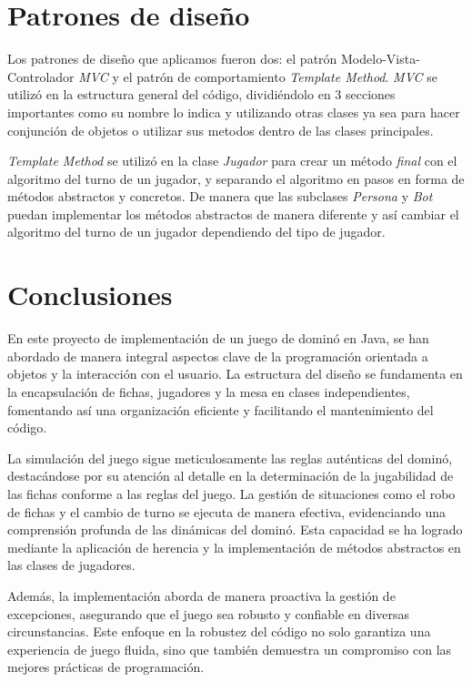 \documentclass[12pt]{article}
\begin{document}
  \section{Patrones de diseño}
  Los patrones de diseño que aplicamos fueron dos: el patrón Modelo-Vista-Controlador \textit{MVC} y el patrón de comportamiento \textit{Template Method}. \textit{MVC} se utilizó en la estructura general del código, dividiéndolo en 3 secciones importantes como su nombre lo indica y utilizando otras clases ya sea para hacer conjunción de objetos o utilizar sus metodos dentro de las clases principales. 
  
  \textit{Template Method} se utilizó en la clase \textit{Jugador} para crear un método \textit{final} con el algoritmo del turno de un jugador, y separando el algoritmo en pasos en forma de métodos abstractos y concretos. De manera que las subclases \textit{Persona} y \textit{Bot} puedan implementar los métodos abstractos de manera diferente y así cambiar el algoritmo del turno de un jugador dependiendo del tipo de jugador.

  \section{Conclusiones}
  En este proyecto de implementación de un juego de dominó en Java, se han abordado de manera integral aspectos clave de la programación orientada a objetos y la interacción con el usuario. La estructura del diseño se fundamenta en la encapsulación de fichas, jugadores y la mesa en clases independientes, fomentando así una organización eficiente y facilitando el mantenimiento del código.

  La simulación del juego sigue meticulosamente las reglas auténticas del dominó, destacándose por su atención al detalle en la determinación de la jugabilidad de las fichas conforme a las reglas del juego. La gestión de situaciones como el robo de fichas y el cambio de turno se ejecuta de manera efectiva, evidenciando una comprensión profunda de las dinámicas del dominó. Esta capacidad se ha logrado mediante la aplicación de herencia y la implementación de métodos abstractos en las clases de jugadores.

  Además, la implementación aborda de manera proactiva la gestión de excepciones, asegurando que el juego sea robusto y confiable en diversas circunstancias. Este enfoque en la robustez del código no solo garantiza una experiencia de juego fluida, sino que también demuestra un compromiso con las mejores prácticas de programación.
\end{document}

